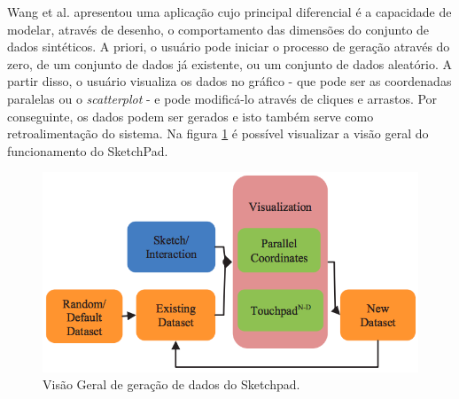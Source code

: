 \documentclass[
	12pt,				%
	openright,			%
	twoside,			%
	a4paper,			%
	english,			%
	brazil				%
	]{abntex2}
\begin{document}
			Wang et al. \cite{BingWang2013} apresentou uma aplicação cujo principal diferencial é a capacidade de modelar, através de desenho, o comportamento das dimensões do conjunto de dados sintéticos. A priori, o usuário pode iniciar o processo de geração através do zero, de um conjunto de dados já existente, ou um conjunto de dados aleatório. A partir disso, o usuário visualiza os dados no gráfico - que pode ser as coordenadas paralelas ou o \emph{scatterplot} - e pode modificá-lo através de cliques e arrastos. Por conseguinte, os dados podem ser gerados e isto também serve como retroalimentação do sistema. Na figura \ref{fig:sketchpad} é possível visualizar a visão geral do funcionamento do SketchPad.
			\begin{figure}[h!]
				\centering
				\includegraphics[width=\linewidth]{./figures/TrabalhosRelacionados/Wang11.png}
				\caption{Visão Geral de geração de dados do Sketchpad.}
				\label{fig:sketchpad}
			\end{figure}
\end{document}
